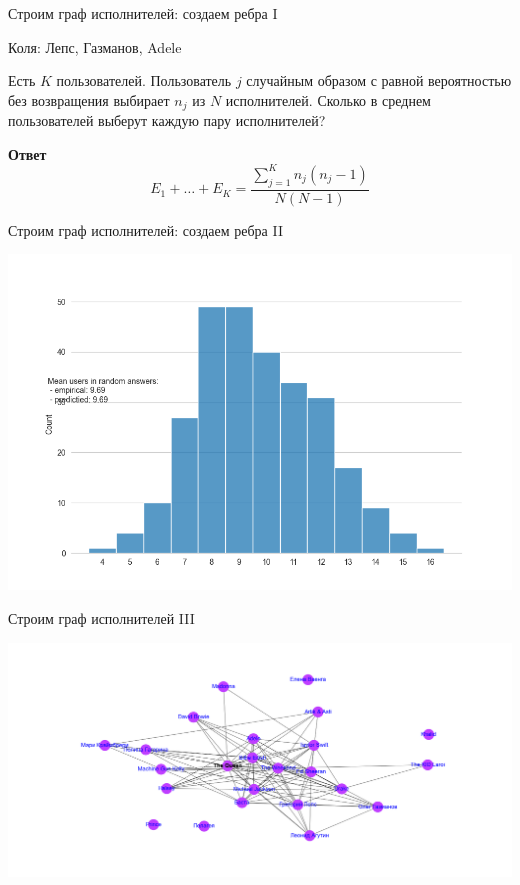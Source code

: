 \documentclass[11pt,aspectratio=169]{beamer}
\begin{document}
\begin{frame}{Строим граф исполнителей: создаем ребра I}

Коля: Лепс, Газманов, Adele

\pause

\begin{center}
\begin{tcolorbox}[colback=vk!5,colframe=vk!70,title=Задача]
Есть $K$ пользователей. Пользователь $j$ случайным образом с равной вероятностью без возвращения выбирает $n_j$ из $N$ исполнителей. Сколько в среднем пользователей выберут каждую пару исполнителей? 
\end{tcolorbox}
\end{center}

\pause

{\bf Ответ}
\[
E_1 + \ldots + E_K = \frac{\sum_{j=1}^K n_j (n_j - 1)}{N (N-1)}
\]
	
\end{frame}

\begin{frame}{Строим граф исполнителей: создаем ребра II}

\begin{center}
\includegraphics[scale=0.4]{images/user_counts.png}
\end{center}

\end{frame}

\begin{frame}{Строим граф исполнителей III}

\begin{center}
\includegraphics[scale=0.35]{images/graph.png}
\end{center}

\end{frame}
\end{document}
